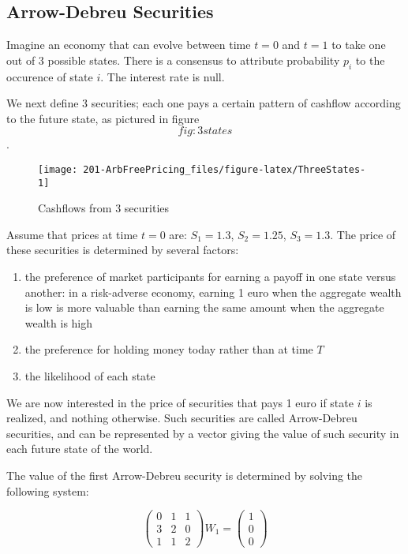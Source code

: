 \documentclass[justified]{tufte-book}
\begin{document}
\hypertarget{arrow-debreu-securities}{%
\subsection{Arrow-Debreu Securities}\label{arrow-debreu-securities}}

Imagine an economy that can evolve between time \(t=0\) and \(t=1\) to take
one out of 3 possible states. There is a consensus to attribute
probability \(p_i\) to the occurence of state \(i\). The interest rate is null.

We next define 3 securities; each one pays a certain pattern of cashflow
according to the future state, as pictured in figure~\[fig:3states\].

\begin{figure}

{\centering \texttt{[image: 201-ArbFreePricing\_files/figure-latex/ThreeStates-1]} 

}

\caption[Cashflows from 3 securities]{Cashflows from 3 securities}\label{fig:ThreeStates}
\end{figure}

Assume that prices at time \(t=0\) are: \(S_1 = 1.3\), \(S_2 = 1.25\),
\(S_3 = 1.3\). The price of these securities is determined by several
factors:

\begin{enumerate}
\def\labelenumi{\arabic{enumi}.}
\item
  the preference of market participants for earning a payoff in one
  state versus another: in a risk-adverse economy, earning 1 euro when
  the aggregate wealth is low is more valuable than earning the same
  amount when the aggregate wealth is high
\item
  the preference for holding money today rather than at time \(T\)
\item
  the likelihood of each state
\end{enumerate}

We are now interested in the price of securities that pays 1 euro if
state \(i\) is realized, and nothing otherwise. Such securities are called
Arrow-Debreu securities, and can be represented by a vector giving the
value of such security in each future state of the world.

The value of the first Arrow-Debreu security is determined by solving
the following system:

\[
\begin{pmatrix}
    0 & 1 & 1 \\
    3 & 2 & 0 \\
    1 & 1 & 2
\end{pmatrix} W_1 =
\begin{pmatrix}
1 \\
0 \\
0
\end{pmatrix}
\]
\end{document}

